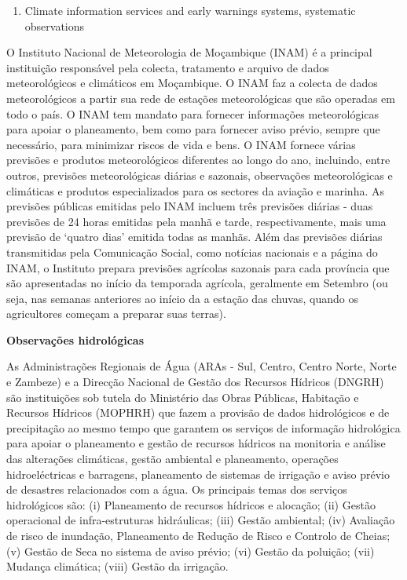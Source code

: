 \documentclass[
]{book}
\providecommand{\tightlist}{%
  \setlength{\itemsep}{0pt}\setlength{\parskip}{0pt}}
\begin{document}
\begin{enumerate}
\def\labelenumi{\roman{enumi}.}
\setcounter{enumi}{1}
\tightlist
\item
  Climate information services and early warnings systems, systematic observations
\end{enumerate}

O Instituto Nacional de Meteorologia de Moçambique (INAM) é a principal instituição responsável pela colecta, tratamento e arquivo de dados meteorológicos e climáticos em Moçambique. O INAM faz a colecta de dados meteorológicos a partir sua rede de estações meteorológicas que são operadas em todo o país. O INAM tem mandato para fornecer informações meteorológicas para apoiar o planeamento, bem como para fornecer aviso prévio, sempre que necessário, para minimizar riscos de vida e bens. O INAM fornece várias previsões e produtos meteorológicos diferentes ao longo do ano, incluindo, entre outros, previsões meteorológicas diárias e sazonais, observações meteorológicas e climáticas e produtos especializados para os sectores da aviação e marinha. As previsões públicas emitidas pelo INAM incluem três previsões diárias - duas previsões de 24 horas emitidas pela manhã e tarde, respectivamente, mais uma previsão de `quatro dias' emitida todas as manhãs. Além das previsões diárias transmitidas pela Comunicação Social, como notícias nacionais e a página do INAM, o Instituto prepara previsões agrícolas sazonais para cada província que são apresentadas no início da temporada agrícola, geralmente em Setembro (ou seja, nas semanas anteriores ao início da a estação das chuvas, quando os agricultores começam a preparar suas terras).

\textbf{Observações hidrológicas}

As Administrações Regionais de Água (ARAs - Sul, Centro, Centro Norte, Norte e Zambeze) e a Direcção Nacional de Gestão dos Recursos Hídricos (DNGRH) são instituições sob tutela do Ministério das Obras Públicas, Habitação e Recursos Hídricos (MOPHRH) que fazem a provisão de dados hidrológicos e de precipitação ao mesmo tempo que garantem os serviços de informação hidrológica para apoiar o planeamento e gestão de recursos hídricos na monitoria e análise das alterações climáticas, gestão ambiental e planeamento, operações hidroeléctricas e barragens, planeamento de sistemas de irrigação e aviso prévio de desastres relacionados com a água. Os principais temas dos serviços hidrológicos são:
(i) Planeamento de recursos hídricos e alocação;
(ii) Gestão operacional de infra-estruturas hidráulicas;
(iii) Gestão ambiental;
(iv) Avaliação de risco de inundação, Planeamento de Redução de Risco e Controlo de Cheias;
(v) Gestão de Seca no sistema de aviso prévio;
(vi) Gestão da poluição;
(vii) Mudança climática;
(viii) Gestão da irrigação.
\end{document}
